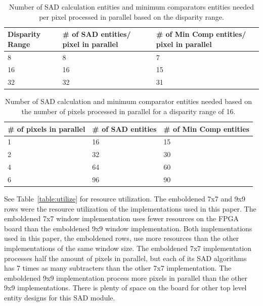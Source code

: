 \begin{table}
\begin{center}
	\begin{tabular}{| p{2cm} | p{4cm} | p{5cm} |}
		\hline 
		\rowstyle{\bfseries} Disparity Range & 
		\rowstyle{\bfseries} \# of SAD entities/ pixel in parallel &
		\rowstyle{\bfseries} \# of Min Comp entities/ pixel in parallel
		\\ \hline
		8 & 8 & 7
		\\ \hline 
		\rowstyle{\bfseries} 16 & 
		\rowstyle{\bfseries} 16 & 
		\rowstyle{\bfseries} 15
		\\ \hline
		32 & 32 & 31
		\\ \hline 
	\end{tabular}
	\captionfonts
	\caption{Number of SAD calculation entities and minimum comparators entities needed per pixel processed in parallel based on the disparity range.}
	\label{table:dispRange}
\end{center}
\end{table}

\begin{table}
\begin{center}
	\begin{tabular}{| p{3cm} | p{3cm} | p{3cm} |}
		\hline 
		\rowstyle{\bfseries} \# of pixels in parallel & 
		\rowstyle{\bfseries} \# of SAD entities &
		\rowstyle{\bfseries} \# of Min Comp entities 
		\\ \hline
		1 & 16 & 15
		\\ \hline 
		\rowstyle{\bfseries} 2 & 
		\rowstyle{\bfseries} 32 & 
		\rowstyle{\bfseries} 30
		\\ \hline 
		\rowstyle{\bfseries} 4 & 
		\rowstyle{\bfseries} 64 & 
		\rowstyle{\bfseries} 60
		\\ \hline
		6 & 96 & 90
		\\ \hline 
	\end{tabular}
	\captionfonts
	\caption{Number of SAD calculation and minimum comparator entities needed based on the number of pixels processed in parallel for a disparity range of 16.}
	\label{table:pixelInParallel}
\end{center}
\end{table}

See Table~\ref{table:utilize} for resource utilization. The emboldened 7x7 and 9x9 rows were the resource utilization of the implementations used in this paper. The emboldened 7x7 window implementation uses fewer resources on the FPGA board than the emboldened 9x9 window implementation. Both implementations used in this paper, the emboldened rows, use more resources than the other implementations of the same window size. The emboldened 7x7 implementation processes half the amount of pixels in parallel, but each of its SAD algorithms has 7 times as many subtracters than the other 7x7 implementation. The emboldened 9x9 implementation process more pixels in parallel than the other 9x9 implementations. There is plenty of space on the board for other top level entity designs for this SAD module.

